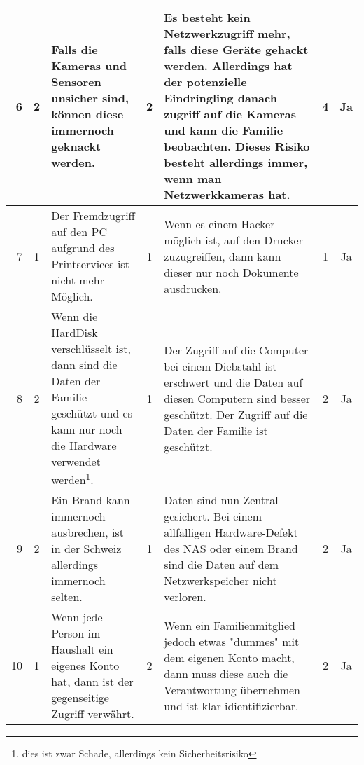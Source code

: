 \begin{landscape}
\begin{tabularx}{\columnwidth}{|r|c|X|c|X|c|c|}
		6 &  \cellcolor{yellow}2 & Falls die Kameras und Sensoren unsicher sind, können diese immernoch geknackt werden. & \cellcolor{yellow}2 & Es besteht kein Netzwerkzugriff mehr, falls diese Geräte gehackt werden. Allerdings hat der potenzielle Eindringling danach zugriff auf die Kameras und kann die Familie beobachten. Dieses Risiko besteht allerdings immer, wenn man Netzwerkkameras hat. & \cellcolor{yellow}4 & \cellcolor{green} Ja  \\ \hline
		
		7 &  \cellcolor{green}1 & Der Fremdzugriff auf den PC aufgrund des Printservices ist nicht mehr Möglich. & \cellcolor{green}1 & Wenn es einem Hacker möglich ist, auf den Drucker zuzugreiffen, dann kann dieser nur noch Dokumente ausdrucken. & \cellcolor{green}1 & \cellcolor{green} Ja  \\ \hline
		
		8 &  \cellcolor{yellow}2 & Wenn die HardDisk verschlüsselt ist, dann sind die Daten der Familie geschützt und es kann nur noch die Hardware verwendet werden\footnote{dies ist zwar Schade, allerdings kein Sicherheitsrisiko}. & \cellcolor{green}1 & Der Zugriff auf die Computer bei einem Diebstahl ist erschwert und die Daten auf diesen Computern sind besser geschützt. Der Zugriff auf die Daten der Familie ist geschützt. & \cellcolor{green}2 & \cellcolor{green} Ja  \\ \hline
		
		9 &  \cellcolor{yellow}2 &  Ein Brand kann immernoch ausbrechen, ist in der Schweiz allerdings immernoch selten. & \cellcolor{green}1 & Daten sind nun Zentral gesichert. Bei einem allfälligen Hardware-Defekt des NAS oder einem Brand sind die Daten auf dem Netzwerkspeicher nicht verloren. & \cellcolor{green}2 & \cellcolor{green} Ja  \\ \hline
		
		10 &  \cellcolor{green}1 & Wenn jede Person im Haushalt ein eigenes Konto hat, dann ist der gegenseitige Zugriff verwährt. & \cellcolor{yellow}2 & Wenn ein Familienmitglied jedoch etwas "dummes" mit dem eigenen Konto macht, dann muss diese auch die Verantwortung übernehmen und ist klar idientifizierbar. & \cellcolor{green}2 & \cellcolor{green} Ja  \\ \hline
		
	\end{tabularx}
	
	
\end{landscape}